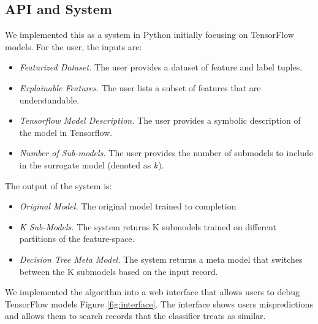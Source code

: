 \subsection{API and System}
We implemented this as a system in Python initially focusing on TensorFlow models.
For the user, the inputs are:
\begin{itemize}
\item \emph{Featurized Dataset. } The user provides a dataset of feature and label tuples.

\item \emph{Explainable Features. } The user lists a subset of features that are understandable.

\item \emph{Tensorflow Model Description. } The user provides a symbolic description of the model in Tensorflow.

\item \emph{Number of Sub-models. } The user provides the number of submodels to include in the surrogate model (denoted as $k$).
\end{itemize}

The output of the system is:
\begin{itemize}
\item \emph{Original Model. } The original model trained to completion

\item \emph{K Sub-Models. } The system returns K submodels trained on different partitions of the feature-space.

\item \emph{Decision Tree Meta Model. } The system returns a meta model that switches between the K submodels based on the input record.
\end{itemize}

We implemented the algorithm into a web interface that allows users to debug TensorFlow models Figure \ref{fig:interface}. The interface shows users mispredictions and allows them to search records that the classifier treats as similar.

